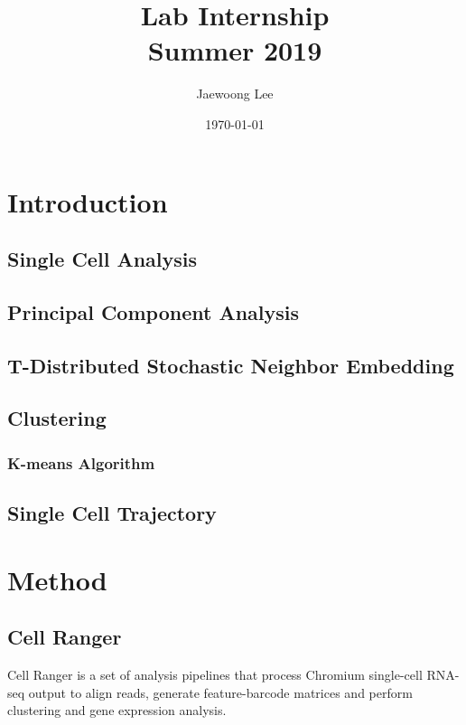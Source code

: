 \documentclass[aps, 10pt, a4paper]{article}
\title{Lab Internship\\Summer 2019}
\author{Jaewoong Lee}
\date{\today}
\begin{document}
    \maketitle
    \newpage
    
    \tableofcontents
    \listoftables
    \listoffigures
    \listoflistings
    \newpage
    
    \section{Introduction}
        \subsection{Single Cell Analysis}
        
        \subsection{Principal Component Analysis}
        
        \subsection{T-Distributed Stochastic Neighbor Embedding}
        
        \subsection{Clustering}
        
            \subsubsection{K-means Algorithm}
        
        \subsection{Single Cell Trajectory}
    
    \section{Method}
        \subsection{Cell Ranger}
            Cell Ranger is a set of analysis pipelines that process Chromium single-cell RNA-seq output to align reads, generate feature-barcode matrices and perform clustering and gene expression analysis. \cite{ref:cellranger}
        
\end{document}

